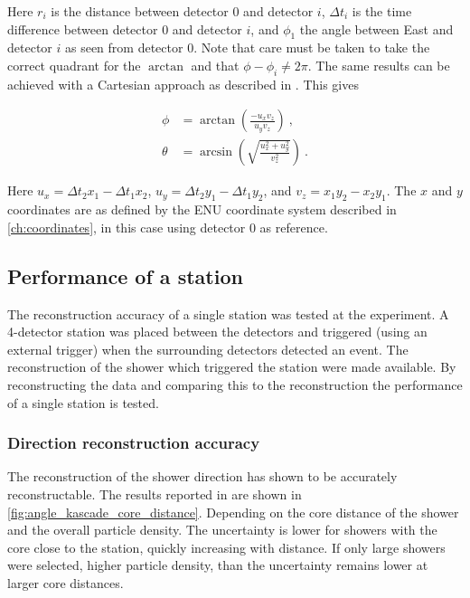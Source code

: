 Here $r_i$ is the distance between detector 0 and detector $i$, $\Delta t_i$ is the time difference between detector 0 and detector $i$, and $\phi_1$ the angle between East and detector $i$ as seen from detector 0. Note that care must be taken to take the correct quadrant for the $\arctan$ and that $\phi - \phi_i \ne 2 \pi$. The same results can be achieved with a Cartesian approach as described in \cite{montanus2015direction}. This gives

\begin{equation}
    \label{eq:direction-2dflat}
    \begin{split}
        \phi &= \arctan \left(\frac{-u_x v_z}{u_y v_z} \right) \ , \\
        \theta &= \arcsin \left(\sqrt{\frac{u_x^2+u_y^2}{v_z^2}} \right) \ .
    \end{split}
\end{equation}

Here $u_x = \Delta t_2 x_1 - \Delta t_1 x_2$, $u_y = \Delta t_2 y_1 - \Delta t_1 y_2$, and $v_z = x_1 y_2 - x_2 y_1$. The $x$ and $y$ coordinates are as defined by the ENU coordinate system described in \cref{ch:coordinates}, in this case using detector 0 as reference.


\subsection{Performance of a station}

The reconstruction accuracy of a single \hisparc station was tested at the \kascade experiment. A 4-detector \hisparc station was placed between the \kascade detectors and triggered (using an external trigger) when the surrounding \kascade detectors detected an event. The \kascade reconstruction of the shower which triggered the \hisparc station were made available. By reconstructing the \hisparc data and comparing this to the \kascade reconstruction the performance of a single station is tested.


\subsubsection{Direction reconstruction accuracy}

The reconstruction of the shower direction has shown to be accurately reconstructable. The results reported in \cite{fokkema2012hisparc} are shown in \cref{fig:angle_kascade_core_distance}. Depending on the core distance of the shower and the overall particle density. The uncertainty is lower for showers with the core close to the station, quickly increasing with distance. If only large showers were selected, higher particle density, than the uncertainty remains lower at larger core distances.

